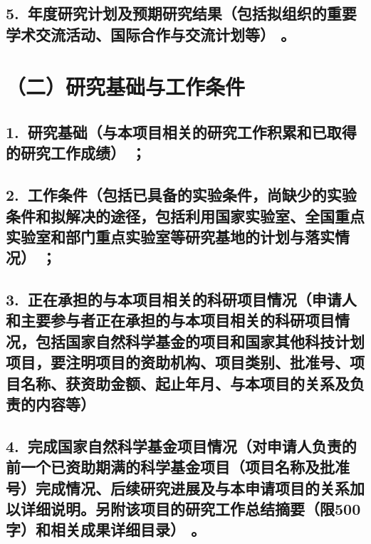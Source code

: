 \documentclass[12pt,UTF8,AutoFakeBold=2.5,a4paper]{ctexart} %
\begin{document}



\subsection{\hspace{1.5em}  5.~{\bfseries 年度研究计划及预期研究结果}（包括拟组织的重要学术交流活动、国际合作与交流计划等）\hspace{-14pt} 。}






\section{{\bfseries（二）研究基础与工作条件}} %


\subsection{\hspace{1.45em}  1.~{\bfseries 研究基础}（与本项目相关的研究工作积累和已取得的研究工作成绩）\hspace{-14pt} ；}




\subsection{\hspace{1.45em}  2.~{\bfseries 工作条件}（包括已具备的实验条件，尚缺少的实验条件和拟解决的途径，包括利用国家实验室、全国重点实验室和部门重点实验室等研究基地的计划与落实情况）\hspace{-14pt}  ；}



\subsection{\hspace{1.45em}  3.~{\bfseries 正在承担的与本项目相关的科研项目情况}（申请人和主要参与者正在承担的与本项目相关的科研项目情况，包括国家自然科学基金的项目和国家其他科技计划项目，要注明项目的资助机构、项目类别、批准号、项目名称、获资助金额、起止年月、与本项目的关系及负责的内容等）}



\subsection{\hspace{1.45em}  4.~{\bfseries 完成国家自然科学基金项目情况}（对申请人负责的前一个已资助期满的科学基金项目（项目名称及批准号）完成情况、后续研究进展及与本申请项目的关系加以详细说明。另附该项目的研究工作总结摘要（限500字）和相关成果详细目录）\hspace{-14pt} 。}
\end{document}
